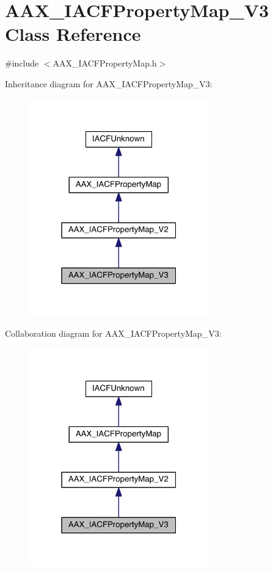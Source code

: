 \hypertarget{a00081}{}\section{A\+A\+X\+\_\+\+I\+A\+C\+F\+Property\+Map\+\_\+\+V3 Class Reference}
\label{a00081}


{\ttfamily \#include $<$A\+A\+X\+\_\+\+I\+A\+C\+F\+Property\+Map.\+h$>$}



Inheritance diagram for A\+A\+X\+\_\+\+I\+A\+C\+F\+Property\+Map\+\_\+\+V3\+:
\nopagebreak
\begin{figure}[H]
\begin{center}
\leavevmode
\includegraphics[width=220pt]{a00586}
\end{center}
\end{figure}


Collaboration diagram for A\+A\+X\+\_\+\+I\+A\+C\+F\+Property\+Map\+\_\+\+V3\+:
\nopagebreak
\begin{figure}[H]
\begin{center}
\leavevmode
\includegraphics[width=220pt]{a00587}
\end{center}
\end{figure}


